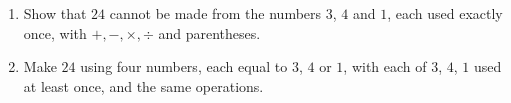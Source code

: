 \begin{enumerate}
\item[(a)] Show that $24$ cannot be made from the numbers $3$, $4$ and $1$, each used exactly once, with $+,-,\times,\div$ and parentheses.
\item[(b)] Make $24$ using four numbers, each equal to $3$, $4$ or $1$, with each of $3$, $4$, $1$ used at least once, and the same operations.
\end{enumerate}
